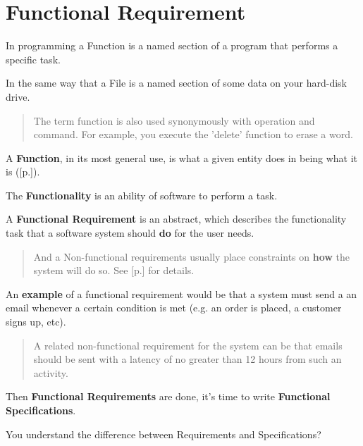 \section{Functional Requirement}
\label{sec:Functional Requirement}

In programming a Function is a named section of a program that performs a specific task.

In the same way that a File is a named section of some data on your hard-disk drive.

\begin{quote}
The term function is also used synonymously with operation and command. For example, you execute the 'delete' function to erase a word.                                                                                                                                       \end{quote} 

A \textbf{Function}, in its most general use, is what a given entity does in being what it is ([p.\pageref{sec:Function}]).

The \textbf{Functionality} is an ability of software to perform a task.

A \textbf{Functional Requirement} is an abstract, which describes the functionality task that a software system should \textbf{do} for the user needs.

\begin{quote}
And a Non-functional requirements usually place constraints on \textbf{how} the system will do so. See [p.\pageref{sec:Non-functional Requirement}] for details.                                                                                        \end{quote} 

An \textbf{example} of a functional requirement would be that a system must send a an email whenever a certain condition is met (e.g. an order is placed, a customer signs up, etc).

\begin{quote}
A related non-functional requirement for the system can be that emails should be sent with a latency of no greater than 12 hours from such an activity.
\end{quote} 

Then \textbf{Functional Requirements} are done, it's time to write \textbf{Functional Specifications}.

You understand the difference between Requirements and Specifications?
